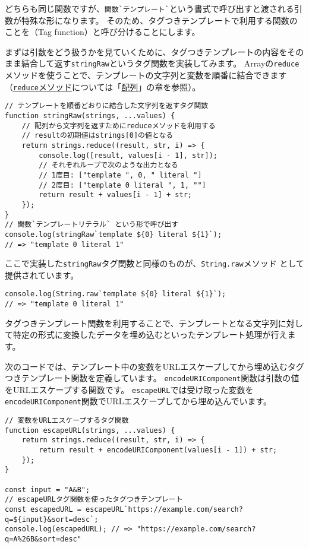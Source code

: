 どちらも同じ関数ですが、\texttt{関数}\lstinline{`}\texttt{テンプレート}\lstinline{`}という書式で呼び出すと渡される引数が特殊な形になります。
そのため、タグつきテンプレートで利用する関数のことを\textbf{}（Tag
function）と呼び分けることにします。

まずは引数をどう扱うかを見ていくために、タグつきテンプレートの内容をそのまま結合して返す\texttt{stringRaw}というタグ関数を実装してみます。
Arrayの\texttt{reduce}メソッドを使うことで、テンプレートの文字列と変数を順番に結合できます（\hyperlink{array-reduce}{\texttt{reduce}メソッド}については「\hyperlink{array}{配列}」の章を参照）。

\begin{lstlisting}
// テンプレートを順番どおりに結合した文字列を返すタグ関数
function stringRaw(strings, ...values) {
    // 配列から文字列を返すためにreduceメソッドを利用する
    // resultの初期値はstrings[0]の値となる
    return strings.reduce((result, str, i) => {
        console.log([result, values[i - 1], str]);
        // それぞれループで次のような出力となる
        // 1度目: ["template ", 0, " literal "]
        // 2度目: ["template 0 literal ", 1, ""]
        return result + values[i - 1] + str;
    });
}
// 関数`テンプレートリテラル` という形で呼び出す
console.log(stringRaw`template ${0} literal ${1}`); 
// => "template 0 literal 1"
\end{lstlisting}

ここで実装した\texttt{stringRaw}タグ関数と同様のものが、\texttt{String.raw}メソッド\,\protect{}\,として提供されています。

\begin{lstlisting}
console.log(String.raw`template ${0} literal ${1}`); 
// => "template 0 literal 1"
\end{lstlisting}

タグつきテンプレート関数を利用することで、テンプレートとなる文字列に対して特定の形式に変換したデータを埋め込むといったテンプレート処理が行えます。

次のコードでは、テンプレート中の変数をURLエスケープしてから埋め込むタグつきテンプレート関数を定義しています。
\texttt{encodeURIComponent}関数は引数の値をURLエスケープする関数です。
\texttt{escapeURL}では受け取った変数を\texttt{encodeURIComponent}関数でURLエスケープしてから埋め込んでいます。

\begin{lstlisting}
// 変数をURLエスケープするタグ関数
function escapeURL(strings, ...values) {
    return strings.reduce((result, str, i) => {
        return result + encodeURIComponent(values[i - 1]) + str;
    });
}

const input = "A&B";
// escapeURLタグ関数を使ったタグつきテンプレート
const escapedURL = escapeURL`https://example.com/search?q=${input}&sort=desc`;
console.log(escapedURL); // => "https://example.com/search?q=A%26B&sort=desc"
\end{lstlisting}

